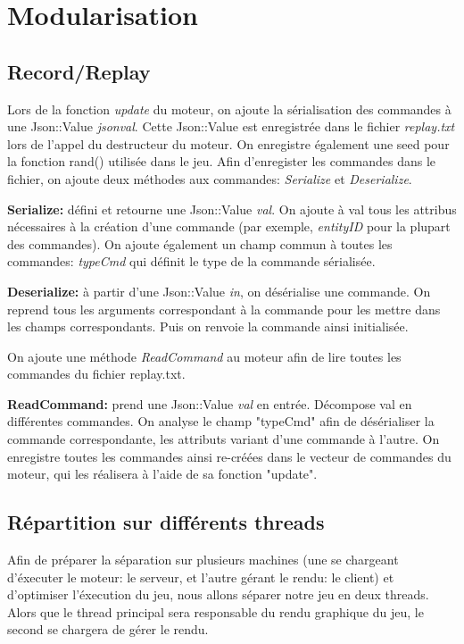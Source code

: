 \section{Modularisation}
\label{sec:module}

\subsection{Record/Replay}
Lors de la fonction \textit{update} du moteur, on ajoute la sérialisation des commandes à une Json::Value \textit{jsonval}. Cette Json::Value est enregistrée dans le fichier \textit{replay.txt} lors de l'appel du destructeur du moteur. On enregistre également une seed pour la fonction rand() utilisée dans le jeu.
Afin d'enregister les commandes dans le fichier, on ajoute deux méthodes aux commandes: \textit{Serialize} et \textit{Deserialize}.
\par \textbf{Serialize:} défini et retourne une Json::Value \textit{val}. On ajoute à val tous les attribus nécessaires à la création d'une commande (par exemple, \textit{entityID} pour la plupart des commandes). On ajoute également un champ commun à toutes les commandes: \textit{typeCmd} qui définit le type de la commande sérialisée.
\par \textbf{Deserialize:} à partir d'une Json::Value \textit{in}, on désérialise une commande. On reprend tous les arguments correspondant à la commande pour les mettre dans les champs correspondants. Puis on renvoie la commande ainsi initialisée.

On ajoute une méthode \textit{ReadCommand} au moteur afin de lire toutes les commandes du fichier replay.txt. 

\par \textbf{ReadCommand:} prend une Json::Value \textit{val} en entrée. Décompose val en différentes commandes. On analyse le champ "typeCmd" afin de désérialiser la commande correspondante, les attributs variant d'une commande à l'autre. On enregistre toutes les commandes ainsi re-créées dans le vecteur de commandes du moteur, qui les réalisera à l'aide de sa fonction "update".

\subsection{Répartition sur différents threads}
Afin de préparer la séparation sur plusieurs machines (une se chargeant d'éxecuter le moteur: le serveur, et l'autre gérant le rendu: le client) et d'optimiser l'éxecution du jeu, nous allons séparer notre jeu en deux threads. Alors que le thread principal sera responsable du rendu graphique du jeu, le second se chargera de gérer le rendu.

